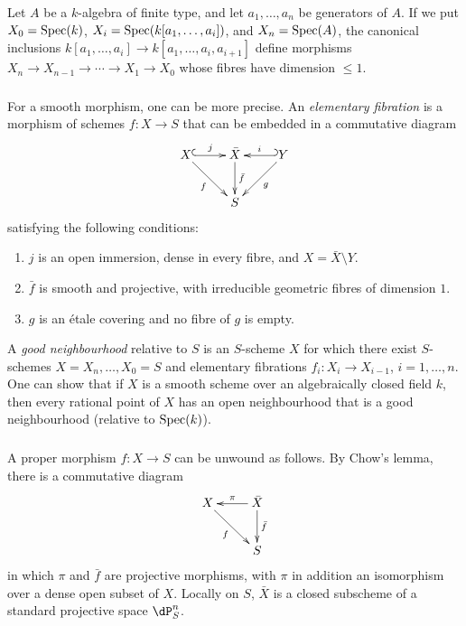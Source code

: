 Let $A$ be a $k$-algebra of finite type, and let $a_1,\dotsc,a_n$ be
generators of $A$. If we put $X_0=\operatorname{Spec}(k)$,
$X_i=\operatorname{Spec}(k[a_1,\dotsc,a_i])$, and $X_n=\operatorname{Spec}(A)$, the canonical
inclusions
$k[a_1,\dotsc,a_i]\to k[a_1,\dotsc,a_i,a_{i+1}]$ define morphisms
$X_n\to X_{n-1}\to\cdots\to X_1\to X_0$ whose fibres have dimension
$\leqslant1$.

\subsubsection{}\label{I:3-4-2}

For a smooth morphism, one can be more precise. An
\emph{elementary fibration} is a morphism of schemes $f:X\to S$ that
can be embedded in a commutative diagram
\[\xymatrix{
  X \ar@{^{(}->}[r]^-j \ar[dr]_-f
    & \bar X \ar[d]^-{\bar f}
    & \ar@{_{(}->}[l]_-i \ar[dl]^-g Y \\
  & S
}\]
satisfying the following conditions:
\begin{enumerate}[\indent i)]
  \item $j$ is an open immersion, dense in every fibre, and
    $X=\bar X\setminus Y$.
  \item $\bar f$ is smooth and projective, with irreducible geometric
    fibres of dimension $1$.
  \item $g$ is an étale covering and no fibre of $g$ is empty.
\end{enumerate}

A \emph{good neighbourhood} relative to $S$ is an $S$-scheme $X$ for
which there exist $S$-schemes $X=X_n,\dotsc,X_0=S$ and elementary
fibrations $f_i:X_i\to X_{i-1}$, $i=1,\dotsc,n$. One can show
\cite[XI 3.3]{sga4} that if $X$ is a smooth scheme over an algebraically
closed field $k$, then every rational point of $X$ has an open
neighbourhood that is a good neighbourhood (relative to $\operatorname{Spec}(k)$).

\subsubsection{}\label{I:3-4-3}

A proper morphism $f:X\to S$ can be unwound as follows. By Chow's lemma,
there is a commutative diagram
\[\xymatrix{
  X \ar[dr]_-f
    & \ar[l]_-\pi \ar[d]^-{\bar f} \bar X \\
  & S
}\]
in which $\pi$ and $\bar f$ are projective morphisms, with $\pi$ in
addition an isomorphism over a dense open subset of $X$. Locally on
$S$, $\bar X$ is a closed subscheme of a standard projective space
$\dP_S^n$.

